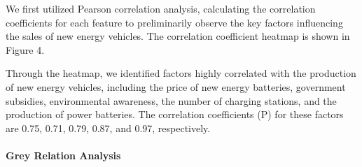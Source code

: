\documentclass{apmcmthesis}
\begin{document}
\newpage

We first utilized Pearson correlation analysis, calculating the correlation coefficients for each feature to preliminarily observe the key factors influencing the sales of new energy vehicles. The correlation coefficient heatmap is shown in Figure 4.

Through the heatmap, we identified factors highly correlated with the production of new energy vehicles, including the price of new energy batteries, government subsidies, environmental awareness, the number of charging stations, and the production of power batteries. The correlation coefficients (P) for these factors are 0.75, 0.71, 0.79, 0.87, and 0.97, respectively.

\paragraph{Grey Relation Analysis}
\end{document}
